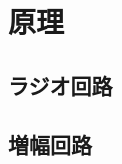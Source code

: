 \documentclass[report.tex]{subfiles}
\begin{document}
\section{原理}

\subsection{ラジオ回路}

\subsection{増幅回路}
\end{document}
